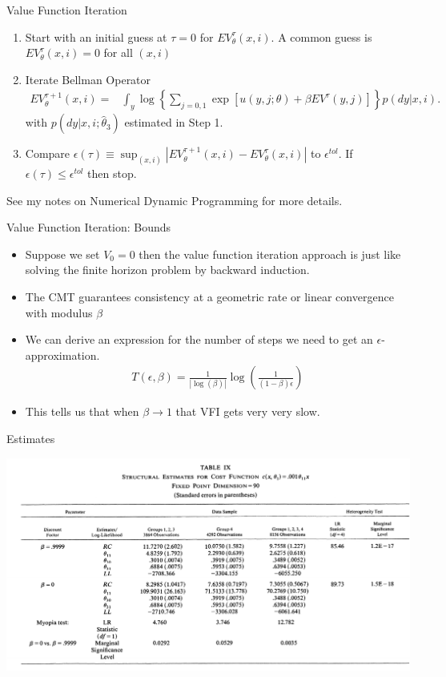 \documentclass[xcolor=pdftex,dvipsnames,table,mathserif]{beamer}
\begin{document}
\begin{frame}{Value Function Iteration}
\footnotesize
\begin{enumerate}
\item Start with an initial guess at $\tau=0$ for $EV^{\tau}_{\theta}(x,i)$. A common guess is $EV_{\theta}^{\tau}(x,i) = 0$ for all $(x,i)$
\item Iterate Bellman Operator
\begin{eqnarray*}
EV_{\theta}^{\tau+1}(x,i)= & \int_y \log  \left \{ \sum_{j=0,1} \exp [ u(y, j ; \theta)  + \beta EV^{\tau}(y,j)] \right \} p(dy|x,i).
\end{eqnarray*}
with $p(dy | x, i; \hat \theta_3)$ estimated in Step 1.
\item Compare $\epsilon(\tau) \equiv \sup_{(x,i)} | EV_{\theta}^{\tau+1}(x,i) - EV_{\theta}^{\tau}(x,i)|$ to $\epsilon^{tol}$. If $\epsilon(\tau) \leq \epsilon^{tol}$ then stop.
\end{enumerate}
See my notes on Numerical Dynamic Programming for more details.
\end{frame}



\begin{frame}{Value Function Iteration: Bounds}
\begin{itemize}
\item Suppose we set $V_0 =0$ then the value function iteration approach is just like solving the finite horizon problem by backward induction.
\item The CMT guarantees consistency at a geometric rate or \alert{linear} convergence with modulus $\beta$
\item We can derive an expression for the number of steps we need to get an $\epsilon$-approximation.
\begin{eqnarray*}
T(\epsilon,\beta) = \frac{1}{| \log(\beta) | } \log \left (\frac{1}{(1-\beta)\epsilon} \right)
\end{eqnarray*}
\item This tells us that when $\beta \rightarrow 1$ that VFI gets very very slow.
\end{itemize}
\end{frame}



\begin{frame}{Estimates}
\begin{center}
\hspace*{-.5cm}\includegraphics[scale=.65]{./resources/RustT9.pdf}
\end{center}
\end{frame}
\end{document}
